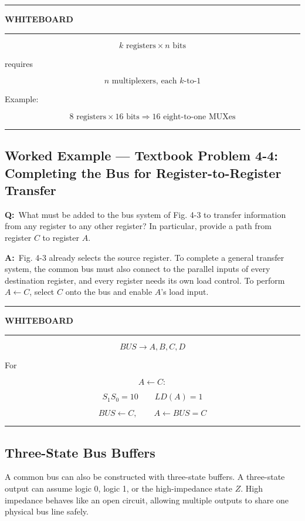 \documentclass[11pt]{article}
\newenvironment{whiteboard}
{
    \par\medskip
    \hrule
    \vspace{0.35em}
    \noindent\textbf{\large WHITEBOARD}
    \par\vspace{0.3em}
    \hrule
    \vspace{0.65em}
}
{
    \vspace{0.45em}
    \hrule
    \par\medskip
}
\newcommand{\Q}{\par\noindent\textbf{Q:}\ }
\newcommand{\A}{\par\noindent\textbf{A:}\ }
\newcommand{\worked}[1]{%
    \subsection*{Worked Example --- #1}
}
\begin{document}
\begin{whiteboard}

\[
\boxed{k\text{ registers}\times n\text{ bits}}
\]

requires

\[
\boxed{n\text{ multiplexers, each }k\text{-to-}1}
\]

Example:

\[
8\text{ registers}\times16\text{ bits}
\Rightarrow
\boxed{16\text{ eight-to-one MUXes}}
\]

\end{whiteboard}

\worked{Textbook Problem 4-4: Completing the Bus for Register-to-Register Transfer}

\Q What must be added to the bus system of Fig. 4-3 to transfer information from any register to any other register? In particular, provide a path from register $C$ to register $A$.

\A Fig. 4-3 already selects the source register. To complete a general transfer system, the common bus must also connect to the parallel inputs of every destination register, and every register needs its own load control. To perform $A\leftarrow C$, select $C$ onto the bus and enable $A$'s load input.

\begin{whiteboard}

\[
\boxed{BUS\rightarrow A,B,C,D}
\]

For

\[
A\leftarrow C:
\]

\[
\boxed{S_1S_0=10}
\qquad
\boxed{LD(A)=1}
\]

\[
BUS\leftarrow C,
\qquad
A\leftarrow BUS=C
\]

\end{whiteboard}

\subsection{Three-State Bus Buffers}

A common bus can also be constructed with three-state buffers. A three-state output can assume logic 0, logic 1, or the high-impedance state $Z$. High impedance behaves like an open circuit, allowing multiple outputs to share one physical bus line safely.
\end{document}
